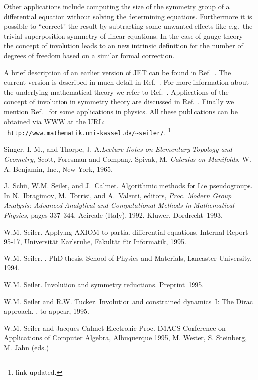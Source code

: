 \documentclass[12pt,a4paper]{article}
\begin{document}
Other applications include computing the size of the symmetry group of a
differential equation without solving the determining equations. Furthermore it
is possible to ``correct'' the result by subtracting some unwanted effects like
e.g.\ the trivial superposition symmetry of linear equations. In the case of
gauge theory the concept of involution leads to an new intrinsic definition for
the number of degrees of freedom based on a similar formal correction.

A brief description of an earlier version of {\small JET} can be found in
Ref.~\cite{wms:aci}. The current version is described in much detail in
Ref.~\cite{wms:axiom}. For more information about the underlying mathematical
theory we refer to Ref.~\cite{wms:diss}. Applications of the concept of
involution in symmetry theory are discussed in Ref.~\cite{wms:mcm}. Finally
we mention Ref.~\cite{wms:con1} for some applications in physics. All these
publications can be obtained via {\small WWW} at the {\small URL}:\\
{\tt
http://www.mathematik.uni-kassel.de/\textasciitilde  seiler/}. 
\footnote{link updated.}
%
%
\begin{thebibliography}{1}
%
 Singer, I. M., and Thorpe, J. A.{\em Lecture Notes on 
  Elementary Topology and Geometry}, Scott, Foresman and Company. 
 Spivak, M. {\em Calculus on Manifolds}, W. A. Benjamin, 
  Inc., New York, 1965. 

J.~Sch\"u, W.M. Seiler, and J.~Calmet.
\newblock Algorithmic methods for {L}ie pseudogroups.
\newblock In N.~Ibragimov, M.~Torrisi, and A.~Valenti, editors, {\em Proc.
  Modern Group Analysis: Advanced Analytical and Computational Methods in
  Mathematical Physics}, pages 337--344, Acireale (Italy), 1992. Kluwer,
  Dordrecht~1993.

W.M. Seiler.
\newblock Applying {AXIOM} to partial differential equations.
\newblock Internal Report 95-17, Universit\"at Karlsruhe, Fakult\"at f\"ur
  Informatik, 1995.

W.M. Seiler.
.
\newblock PhD thesis, School of Physics and Materials, Lancaster University,
  1994.

W.M. Seiler.
\newblock Involution and symmetry reductions.
\newblock Preprint~1995.

W.M. Seiler and R.W. Tucker.
\newblock Involution and constrained dynamics~{I}: The {D}irac approach.
, to appear, 1995.

W.M. Seiler and  Jacques Calmet
Electronic Proc. IMACS Conference on Applications of Computer Algebra, 
Albuquerque 1995, M. Wester, S. Steinberg, M. Jahn (eds.)
\end{thebibliography}
%
\end{document}

